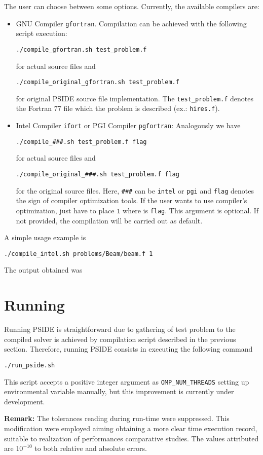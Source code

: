 \documentclass[a4paper,11pt]{article}
\theoremstyle{comm}
\begin{document}
The user can choose between some options. Currently, the available compilers are:
\begin{itemize}
\item GNU Compiler \texttt{gfortran}. Compilation can be achieved with the following script execution:

\begin{Verbatim}[frame=single]
./compile_gfortran.sh test_problem.f
\end{Verbatim}
for actual source files and
\begin{Verbatim}[frame=single]
./compile_original_gfortran.sh test_problem.f
\end{Verbatim}
for original PSIDE source file implementation. The \texttt{test\_problem.f} denotes the Fortran 77 file which the problem is described (ex.: \texttt{hires.f}).

\item Intel Compiler \texttt{ifort} or PGI Compiler \texttt{pgfortran}: Analogously we have

\begin{Verbatim}[frame=single]
./compile_###.sh test_problem.f flag
\end{Verbatim}
for actual source files and
\begin{Verbatim}[frame=single]
./compile_original_###.sh test_problem.f flag
\end{Verbatim}
for the original source files. Here, \texttt{\#\#\#} can be \texttt{intel} or \texttt{pgi} and \texttt{flag} denotes the sign of compiler optimization tools. If the user wants to use compiler's optimization, just have to place \texttt{1} where is \texttt{flag}. This argument is optional. If not provided, the compilation will be carried out as default.

\end{itemize}

A simple usage example is
\begin{Verbatim}[frame=single]
./compile_intel.sh problems/Beam/beam.f 1
\end{Verbatim}

The output obtained was


\section{Running}

Running PSIDE is straightforward due to gathering of test problem to the compiled solver is achieved by compilation script described in the previous section. Therefore, running PSIDE consists in executing the following command
\begin{Verbatim}[frame=single]
./run_pside.sh
\end{Verbatim}

This script accepts a positive integer argument as 
\texttt{OMP\_NUM\_THREADS} 
setting up environmental variable manually, but this improvement is currently under development.

\textbf{Remark:} The tolerances reading during run-time were suppressed. This modification were employed aiming obtaining a more clear time execution record, suitable to realization of performances comparative studies. The values attributed are $10^{-10}$ to both relative and absolute errors.
\end{document}
